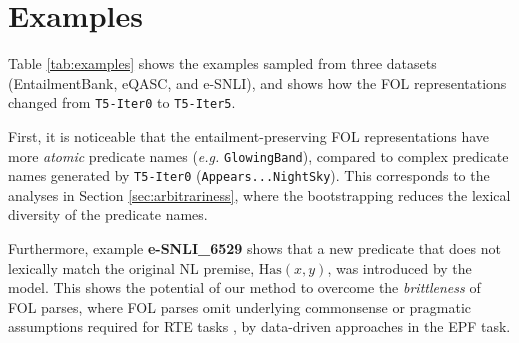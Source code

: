 

\section{Examples}
\label{sec:appendix-examples}

Table \ref{tab:examples} shows the examples sampled from three datasets (EntailmentBank, eQASC, and e-SNLI), and shows how the FOL representations changed from \texttt{T5-Iter0} to \texttt{T5-Iter5}.

First, it is noticeable that the entailment-preserving FOL representations have more \textit{atomic} predicate names (\textit{e.g.} \texttt{GlowingBand}), compared to complex predicate names generated by \texttt{T5-Iter0} (\texttt{Appears...NightSky}). This corresponds to the analyses in Section \ref{sec:arbitrariness}, where the bootstrapping reduces the lexical diversity of the predicate names.

Furthermore, example \textbf{e-SNLI\_6529} shows that a new predicate that does not lexically match the original NL premise, $\text{Has}(x, y)$, was introduced by the model. This shows the potential of our method to overcome the \textit{brittleness} of FOL parses, where FOL parses omit underlying commonsense or pragmatic assumptions required for RTE tasks \citep{bos-nli}, by data-driven approaches in the EPF task.